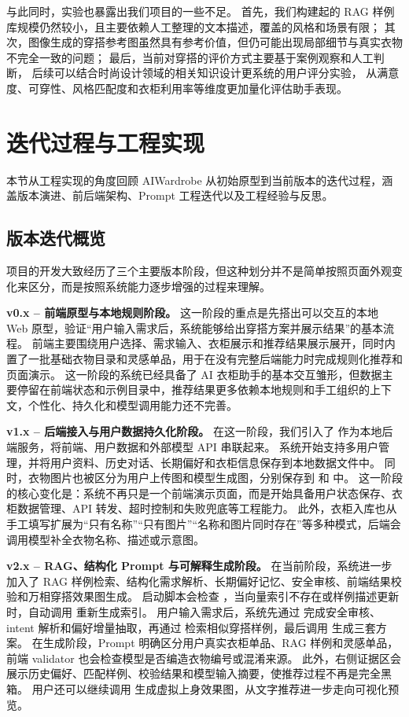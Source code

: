 \documentclass{applemlr}
\begin{document}
与此同时，实验也暴露出我们项目的一些不足。
首先，我们构建起的 RAG 样例库规模仍然较小，且主要依赖人工整理的文本描述，覆盖的风格和场景有限；
其次，图像生成的穿搭参考图虽然具有参考价值，但仍可能出现局部细节与真实衣物不完全一致的问题；
最后，当前对穿搭的评价方式主要基于案例观察和人工判断，
后续可以结合时尚设计领域的相关知识设计更系统的用户评分实验，
从满意度、可穿性、风格匹配度和衣柜利用率等维度更加量化评估助手表现。


\section{迭代过程与工程实现}
\label{sec:engineering}

本节从工程实现的角度回顾 AIWardrobe 从初始原型到当前版本的迭代过程，涵盖版本演进、前后端架构、Prompt 工程迭代以及工程经验与反思。

\subsection{版本迭代概览}

项目的开发大致经历了三个主要版本阶段，但这种划分并不是简单按照页面外观变化来区分，而是按照系统能力逐步增强的过程来理解。

\textbf{v0.x -- 前端原型与本地规则阶段。}
这一阶段的重点是先搭出可以交互的本地 Web 原型，验证“用户输入需求后，系统能够给出穿搭方案并展示结果”的基本流程。
前端主要围绕用户选择、需求输入、衣柜展示和推荐结果展示展开，同时内置了一批基础衣物目录和灵感单品，用于在没有完整后端能力时完成规则化推荐和页面演示。
这一阶段的系统已经具备了 AI 衣柜助手的基本交互雏形，但数据主要停留在前端状态和示例目录中，推荐结果更多依赖本地规则和手工组织的上下文，个性化、持久化和模型调用能力还不完善。

\textbf{v1.x -- 后端接入与用户数据持久化阶段。}
在这一阶段，我们引入了  作为本地后端服务，将前端、用户数据和外部模型 API 串联起来。
系统开始支持多用户管理，并将用户资料、历史对话、长期偏好和衣柜信息保存到本地数据文件中。
同时，衣物图片也被区分为用户上传图和模型生成图，分别保存到  和  中。
这一阶段的核心变化是：系统不再只是一个前端演示页面，而是开始具备用户状态保存、衣柜数据管理、API 转发、超时控制和失败兜底等工程能力。
此外，衣柜入库也从手工填写扩展为“只有名称”“只有图片”“名称和图片同时存在”等多种模式，后端会调用模型补全衣物名称、描述或示意图。

\textbf{v2.x -- RAG、结构化 Prompt 与可解释生成阶段。}
在当前阶段，系统进一步加入了 RAG 样例检索、结构化需求解析、长期偏好记忆、安全审核、前端结果校验和万相穿搭效果图生成。
启动脚本会检查 ，当向量索引不存在或样例描述更新时，自动调用  重新生成索引。
用户输入需求后，系统先通过  完成安全审核、intent 解析和偏好增量抽取，再通过  检索相似穿搭样例，最后调用  生成三套方案。
在生成阶段，Prompt 明确区分用户真实衣柜单品、RAG 样例和灵感单品，前端 validator 也会检查模型是否编造衣物编号或混淆来源。
此外，右侧证据区会展示历史偏好、匹配样例、校验结果和模型输入摘要，使推荐过程不再是完全黑箱。
用户还可以继续调用  生成虚拟上身效果图，从文字推荐进一步走向可视化预览。
\end{document}
